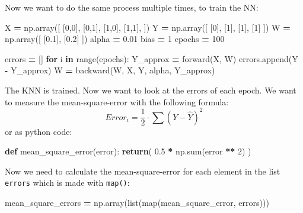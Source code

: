 \documentclass[
]{book}
\newenvironment{Shaded}{\begin{snugshade}}{\end{snugshade}}
\newcommand{\BuiltInTok}[1]{#1}
\newcommand{\ControlFlowTok}[1]{\textcolor[rgb]{0.13,0.29,0.53}{\textbf{#1}}}
\newcommand{\DecValTok}[1]{\textcolor[rgb]{0.00,0.00,0.81}{#1}}
\newcommand{\FloatTok}[1]{\textcolor[rgb]{0.00,0.00,0.81}{#1}}
\newcommand{\KeywordTok}[1]{\textcolor[rgb]{0.13,0.29,0.53}{\textbf{#1}}}
\newcommand{\NormalTok}[1]{#1}
\newcommand{\OperatorTok}[1]{\textcolor[rgb]{0.81,0.36,0.00}{\textbf{#1}}}
\begin{document}
Now we want to do the same process multiple times, to train the NN:

\begin{Shaded}
\begin{Highlighting}[]
\NormalTok{X }\OperatorTok{=}\NormalTok{ np.array([}
\NormalTok{  [}\DecValTok{0}\NormalTok{,}\DecValTok{0}\NormalTok{],}
\NormalTok{  [}\DecValTok{0}\NormalTok{,}\DecValTok{1}\NormalTok{],}
\NormalTok{  [}\DecValTok{1}\NormalTok{,}\DecValTok{0}\NormalTok{],}
\NormalTok{  [}\DecValTok{1}\NormalTok{,}\DecValTok{1}\NormalTok{],}
\NormalTok{])}
\NormalTok{Y }\OperatorTok{=}\NormalTok{ np.array([}
\NormalTok{  [}\DecValTok{0}\NormalTok{],}
\NormalTok{  [}\DecValTok{1}\NormalTok{],}
\NormalTok{  [}\DecValTok{1}\NormalTok{],}
\NormalTok{  [}\DecValTok{1}\NormalTok{]}
\NormalTok{])}
\NormalTok{W }\OperatorTok{=}\NormalTok{ np.array([}
\NormalTok{  [}\FloatTok{0.1}\NormalTok{], }
\NormalTok{  [}\FloatTok{0.2}\NormalTok{]}
\NormalTok{])}
\NormalTok{alpha }\OperatorTok{=} \FloatTok{0.01}
\NormalTok{bias }\OperatorTok{=} \DecValTok{1}
\NormalTok{epochs }\OperatorTok{=} \DecValTok{100}

\NormalTok{errors }\OperatorTok{=}\NormalTok{ []}
\ControlFlowTok{for}\NormalTok{ i }\KeywordTok{in} \BuiltInTok{range}\NormalTok{(epochs):}
\NormalTok{  Y\_approx }\OperatorTok{=}\NormalTok{ forward(X, W)}
\NormalTok{  errors.append(Y }\OperatorTok{{-}}\NormalTok{ Y\_approx)}
\NormalTok{  W }\OperatorTok{=}\NormalTok{ backward(W, X, Y, alpha, Y\_approx)}
\end{Highlighting}
\end{Shaded}

The KNN is trained. Now we want to look at the errors of each epoch. We want to measure the mean-square-error with the following formula:
\[
  Error_i = \frac{1}{2} \cdot \sum(Y-\hat{Y})^2
\]
or as python code:

\begin{Shaded}
\begin{Highlighting}[]
\KeywordTok{def}\NormalTok{ mean\_square\_error(error):}
  \ControlFlowTok{return}\NormalTok{( }\FloatTok{0.5} \OperatorTok{*}\NormalTok{ np.}\BuiltInTok{sum}\NormalTok{(error }\OperatorTok{**} \DecValTok{2}\NormalTok{) )}
\end{Highlighting}
\end{Shaded}

Now we need to calculate the mean-square-error for each element in the list \texttt{errors} which is made with \texttt{map()}:

\begin{Shaded}
\begin{Highlighting}[]
\NormalTok{mean\_square\_errors }\OperatorTok{=}\NormalTok{ np.array(}\BuiltInTok{list}\NormalTok{(}\BuiltInTok{map}\NormalTok{(mean\_square\_error, errors)))}
\end{Highlighting}
\end{Shaded}
\end{document}
